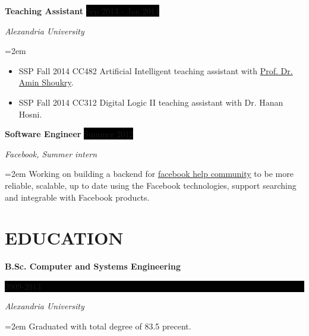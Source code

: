 \documentclass[paper=a4,fontsize=11pt]{scrartcl} %
\newcommand{\NewPart}[1]{\section*{\uppercase{#1}}}
\newcommand{\EducationEntry}[4]{
		\noindent \textbf{#1} \hfill      %
		\colorbox{Black}{%
			\parbox{6em}{%
			\hfill\color{White}#2}} \par  %
		\noindent \textit{#3} \par        %
		\noindent\hangindent=2em\hangafter=0 \small #4 %
		\normalsize \par}
\newcommand{\WorkEntry}[4]{				  %
		\noindent \textbf{#1} \hfill      %
		\colorbox{Black}{\color{White}#2} \par  %
		\noindent \textit{#3} \par              %
		\noindent\hangindent=2em\hangafter=0 \small #4 %
		\normalsize \par}
\begin{document}
	\WorkEntry{Teaching Assistant}{Sep 2013 - Jan 2014}{Alexandria University}{
	\begin{itemize}
	 	\item SSP Fall 2014 CC482 Artificial Intelligent teaching assistant with \href{http://scholar.google.com/citations?user=z10Zl1kAAAAJ&hl=en}{\color{blue}Prof. Dr. Amin Shoukry}.
		\item SSP Fall 2014 CC312 Digital Logic II teaching assistant with Dr. Hanan Hosni.
	\end{itemize}}


	\WorkEntry{Software Engineer}{Summer 2012}{Facebook, Summer intern}{Working on building a backend for \href{https://www.facebook.com/help/community}{\color{blue}facebook help community} to be more reliable, scalable, up to date using the Facebook technologies, support searching and integrable with Facebook products.}



\NewPart{Education}{}

	\EducationEntry{B.Sc. Computer and Systems Engineering}{2009-2013}{Alexandria University}{Graduated with total degree of 83.5 precent.}
\end{document}
